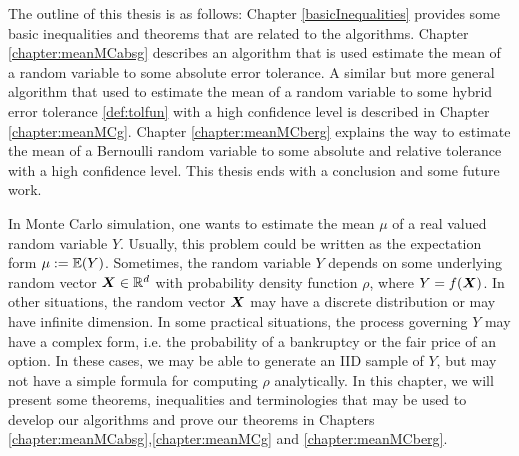 \documentclass{iitthesis}
\theoremstyle{definition}
\begin{document}

The outline of this thesis is as follows: Chapter \ref{basicInequalities} provides some basic inequalities and theorems that are related to the algorithms. Chapter \ref{chapter:meanMCabsg} describes an algorithm that is used estimate the mean of a random variable to some absolute error tolerance. A similar but more general algorithm that used to estimate the mean of a random variable to some hybrid error tolerance \ref{def:tolfun} with a high confidence level is described in Chapter \ref{chapter:meanMCg}. Chapter \ref{chapter:meanMCberg} explains the way to estimate the mean of a Bernoulli random variable to some absolute and relative tolerance with a high confidence level. This thesis ends with a conclusion and some future work.

\label{basicInequalities}

In Monte Carlo simulation, one wants to estimate the mean $\mu$ of a real valued random variable $Y$. Usually, this problem could be written as the expectation form $\mu:=\mathbb{E}(Y)$. Sometimes, the random variable $Y$ depends on some underlying random vector $\boldsymbol{X} \in \mathbb{R}^d$ with probability density function $\rho$, where $Y = f(\boldsymbol{X})$. In other situations, the random vector $\boldsymbol{X}$ may have a discrete distribution or may have infinite dimension. In some practical situations, the process governing $Y$ may have a complex form, i.e. the probability of a bankruptcy or the fair price of an option. In these cases, we may be able to generate an IID sample of $Y$, but may not have a simple formula for computing $\rho$ analytically. 
In this chapter, we will present some theorems, inequalities and terminologies that may be used to develop our algorithms and prove our theorems in Chapters \ref{chapter:meanMCabsg},\ref{chapter:meanMCg} and \ref{chapter:meanMCberg}.

\end{document}
